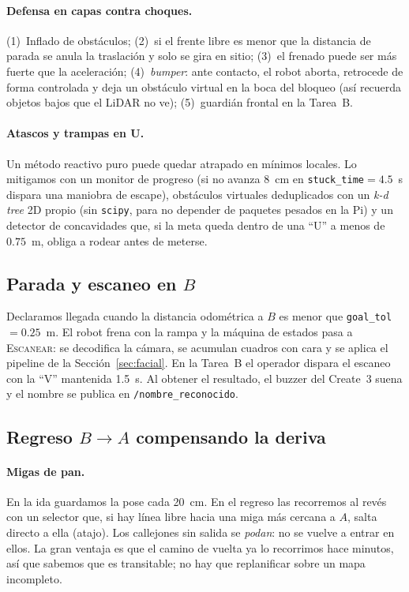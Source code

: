 \documentclass[11pt,a4paper]{article}
\newcommand{\cmd}[1]{\texttt{\small #1}}
\begin{document}
\paragraph{Defensa en capas contra choques.}
(1)~Inflado de obst\'aculos; (2)~si el frente libre es menor que la distancia de parada se anula la traslaci\'on y solo se gira en sitio; (3)~el frenado puede ser
m\'as fuerte que la aceleraci\'on; (4)~\emph{bumper}: ante contacto, el robot aborta, retrocede de forma controlada y deja un obst\'aculo virtual en la boca del bloqueo
(as\'i recuerda objetos bajos que el LiDAR no ve); (5)~guardi\'an frontal en la Tarea~B.

\paragraph{Atascos y trampas en U.} Un m\'etodo reactivo puro puede quedar atrapado en m\'inimos locales. Lo mitigamos con un monitor de progreso (si no avanza 8~cm en
\texttt{stuck\_time}$=4.5$~s dispara una maniobra de escape), obst\'aculos virtuales deduplicados con un \emph{k-d tree} 2D propio (sin \texttt{scipy}, para no depender de
paquetes pesados en la Pi) y un detector de concavidades que, si la meta queda dentro de una ``U'' a menos de $0.75$~m, obliga a rodear antes de meterse.

\subsection{Parada y escaneo en $B$}
Declaramos llegada cuando la distancia odom\'etrica a $B$ es menor que \texttt{goal\_tol}$=0.25$~m. El robot frena con la rampa y la m\'aquina de estados pasa a
\textsc{Escanear}: se decodifica la c\'amara, se acumulan cuadros con cara y se aplica el pipeline de la Secci\'on~\ref{sec:facial}. En la Tarea~B el operador dispara el escaneo con la ``V'' mantenida
1.5~s. Al obtener el resultado, el buzzer del Create~3 suena y el nombre se publica en \cmd{/nombre\_reconocido}.

\subsection{Regreso $B\to A$ compensando la deriva}
\label{sec:retorno}
\paragraph{Migas de pan.} En la ida guardamos la pose cada 20~cm. En el regreso las recorremos al rev\'es con un selector que, si hay l\'inea libre hacia una miga m\'as cercana a $A$,
salta directo a ella (atajo). Los callejones sin salida se \emph{podan}: no se vuelve a entrar en ellos. La gran ventaja es que el camino de vuelta ya lo recorrimos hace minutos, as\'i
que sabemos que es transitable; no hay que replanificar sobre un mapa incompleto.
\end{document}
